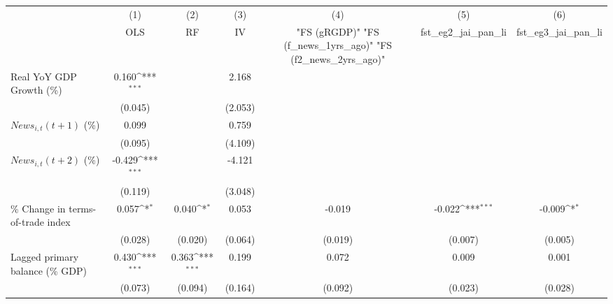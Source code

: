 {
\def\sym#1{\ifmmode^{#1}\else\(^{#1}\)\fi}
\begin{tabular}{l*{6}{c}}
\toprule
                    &\multicolumn{1}{c}{(1)}&\multicolumn{1}{c}{(2)}&\multicolumn{1}{c}{(3)}&\multicolumn{1}{c}{(4)}&\multicolumn{1}{c}{(5)}&\multicolumn{1}{c}{(6)}\\
                    &\multicolumn{1}{c}{OLS}&\multicolumn{1}{c}{RF}&\multicolumn{1}{c}{IV}&\multicolumn{1}{c}{ "FS (gRGDP)"  "FS (f_news_1yrs_ago)"  "FS (f2_news_2yrs_ago)" }&\multicolumn{1}{c}{fst_eg2_jai_pan_li}&\multicolumn{1}{c}{fst_eg3_jai_pan_li}\\
\midrule
Real YoY GDP Growth (\%)&       0.160\sym{***}&                     &       2.168         &                     &                     &                     \\
                    &     (0.045)         &                     &     (2.053)         &                     &                     &                     \\
\addlinespace
$ News_{i,t}(t+1)$ (\%)&       0.099         &                     &       0.759         &                     &                     &                     \\
                    &     (0.095)         &                     &     (4.109)         &                     &                     &                     \\
\addlinespace
$ News_{i,t}(t+2)$ (\%)&      -0.429\sym{***}&                     &      -4.121         &                     &                     &                     \\
                    &     (0.119)         &                     &     (3.048)         &                     &                     &                     \\
\addlinespace
\% Change in terms-of-trade index&       0.057\sym{*}  &       0.040\sym{*}  &       0.053         &      -0.019         &      -0.022\sym{***}&      -0.009\sym{*}  \\
                    &     (0.028)         &     (0.020)         &     (0.064)         &     (0.019)         &     (0.007)         &     (0.005)         \\
\addlinespace
Lagged primary balance (\% GDP)&       0.430\sym{***}&       0.363\sym{***}&       0.199         &       0.072         &       0.009         &       0.001         \\
                    &     (0.073)         &     (0.094)         &     (0.164)         &     (0.092)         &     (0.023)         &     (0.028)         \\

\end{tabular}}
